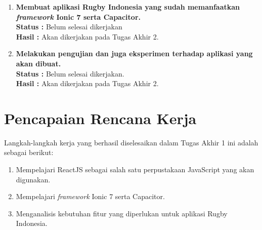 \documentclass[a4paper,twoside]{article}
\begin{document}
\begin{enumerate}
\begin{itemize}
\begin{itemize}
Skenario pada (Tabel \ref{tab:usulan-skenario-halaman-teammate-photos}) juga berlaku ketika pengguna menekan tombol ``LOAD FROM LIBRARY'', hanya saja perbedaannya terdapat pada reaksi sistem, yaitu Aplikasi akan membuka \textit{gallery} dari \textit{smartphone} pengguna.

Pada halaman Teammate Photos, terdapat beberapa komponen dari Ionic 7 yang digunakan. Halaman ini memiliki beberapa komponen, yaitu toolbar, button, content, dan juga card. Analisis dari komponen yang digunakan terdapat pada (Gambar \ref{fig:teammate-photos-analytics}).

\begin{figure} [H]
    \centering
    \texttt{[image: Images/teammates\_photos-analytics.png]}
    \caption{Analisis dari Halaman Teammate Photos}
    \label{fig:teammate-photos-analytics}
\end{figure}
    \end{itemize}
    


\end{itemize}
  



            \item \textbf{Membuat aplikasi Rugby Indonesia yang sudah memanfaatkan \textit{framework} Ionic 7 serta Capacitor.}\\
		{\bf Status :} Belum selesai dikerjakan\\
		{\bf Hasil :} Akan dikerjakan pada Tugas Akhir 2.


            \item \textbf{Melakukan pengujian dan juga eksperimen terhadap aplikasi yang akan dibuat.}\\
		{\bf Status :} Belum selesai dikerjakan.\\
		{\bf Hasil :} Akan dikerjakan pada Tugas Akhir 2.

		
	\end{enumerate}

\section{Pencapaian Rencana Kerja}
Langkah-langkah kerja yang berhasil diselesaikan dalam Tugas Akhir 1 ini adalah sebagai berikut:
\begin{enumerate}
    \item Mempelajari ReactJS sebagai salah satu perpustakaan JavaScript yang akan digunakan.
    \item Mempelajari \textit{framework} Ionic 7 serta Capacitor.
    \item Menganalisis kebutuhan fitur yang diperlukan untuk aplikasi Rugby Indonesia.
\end{enumerate}
\end{document}
